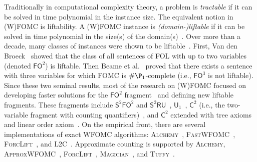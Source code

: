 \documentclass{article}
\theoremstyle{definition}
\newcommand{\FOtwo}{$\mathsf{FO}^{2}$}
\newcommand{\FOthree}{$\mathsf{FO}^{3}$}
\newcommand{\SFO}{$\mathsf{S}^{2}\mathsf{FO}^{2}$}
\newcommand{\SRU}{$\mathsf{S}^{2}\mathsf{RU}$}
\newcommand{\Uone}{$\mathsf{U}_{1}$}
\newcommand{\Ctwo}{$\mathsf{C}^{2}$}
\begin{document}
Traditionally in computational complexity theory, a problem is \emph{tractable}
if it can be solved in time polynomial in the instance size. The equivalent
notion in (W)FOMC is liftability. A (W)FOMC instance is \emph{(domain-)liftable}
if it can be solved in time polynomial in the size(s) of the
domain(s)~\cite{jaeger2012liftability}. Over more than a decade, many classes of
instances were shown to be
liftable~\cite{DBLP:conf/kr/BremenK21,DBLP:conf/nips/KazemiKBP16,DBLP:conf/lics/KuusistoL18,DBLP:journals/jair/Kuzelka21}.
First, Van den Broeck~ showed that the class
of all sentences of FOL with up to two variables (denoted \FOtwo{}) is liftable.
Then Beame et al.~ proved that there exists
a sentence with three variables for which FOMC is $\#\P_{1}$-complete (i.e.,
\FOthree{} is not liftable). Since these two seminal results, most of the
research on (W)FOMC focused on developing faster solutions for the \FOtwo{}
fragment~\cite{DBLP:conf/uai/BremenK21,DBLP:conf/aaai/MalhotraS22} and defining
new liftable fragments. These fragments include \SFO{} and
\SRU{}~\cite{DBLP:conf/nips/KazemiKBP16},
\Uone{}~\cite{DBLP:conf/lics/KuusistoL18}, \Ctwo{} (i.e., the two-variable
fragment with counting
quantifiers)~\cite{DBLP:journals/jair/Kuzelka21,DBLP:conf/aaai/MalhotraS22}, and
\Ctwo{} extended with tree axioms~\cite{DBLP:conf/kr/BremenK21} and linear order
axiom~\cite{DBLP:journals/corr/abs-2211-01164}. On the empirical front, there
are several implementations of exact WFOMC algorithms:
\textsc{Alchemy}~\cite{DBLP:journals/cacm/GogateD16},
\textsc{FastWFOMC}~\cite{DBLP:conf/uai/BremenK21},
\textsc{ForcLift}~\cite{DBLP:conf/ijcai/BroeckTMDR11}, and
\textsc{L2C}~\cite{DBLP:conf/kr/KazemiP16}. Approximate counting is supported by
\textsc{Alchemy}, \textsc{ApproxWFOMC}~\cite{DBLP:conf/ijcai/BremenK20},
\textsc{ForcLift}~\cite{DBLP:conf/uai/BroeckCD12},
\textsc{Magician}~\cite{DBLP:conf/aaai/VenugopalSG15}, and
\textsc{Tuffy}~\cite{DBLP:journals/pvldb/NiuRDS11}.


\end{document}
